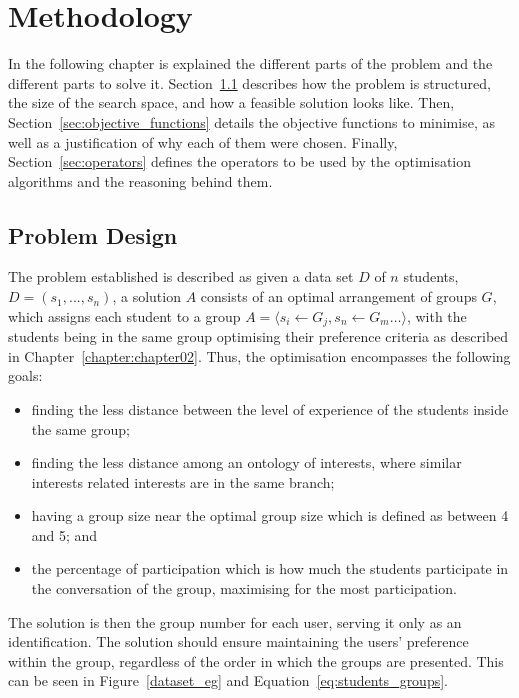 \chapter{Methodology}
\label{chapter:chapter03}

In the following chapter is explained the different parts of the problem and the different parts to solve it. Section~\ref{sec:Problem_design} describes how the problem is structured, the size of the search space, and how a feasible solution looks like. Then, Section~\ref{sec:objective_functions} details the objective functions to minimise, as well as a justification of why each of them were chosen. Finally, Section~\ref{sec:operators} defines the operators to be used by the optimisation algorithms and the reasoning behind them.\\

\section{Problem Design} \label{sec:Problem_design}

The problem established is described as given a data set $D$ of $n$ students, $D = (s_1,...,s_n)$, a solution $A$ consists of an optimal arrangement of groups $G$, which assigns each student to a group $A = \langle s_i \leftarrow G_j, s_n \leftarrow G_m\ldots  \rangle$, with the students being in the same group optimising their preference criteria as described in Chapter~\ref{chapter:chapter02}. Thus, the optimisation encompasses the following goals:

\begin{itemize}
    \item finding the less distance between the level of experience of the students inside the same group;
    \item finding the less distance among an ontology of interests, where similar interests related interests are in the same branch;
    \item having a group size near the optimal group size which is defined as between 4 and 5; and
    \item the percentage of participation which is how much the students participate in the conversation of the group, maximising for the most participation.
\end{itemize}

The solution is then the group number for each user, serving it only as an identification. The solution should ensure maintaining the users' preference within the group, regardless of the order in which the groups are presented. This can be seen in Figure~\ref{dataset_eg} and Equation~\ref{eq:students_groups}.\\

